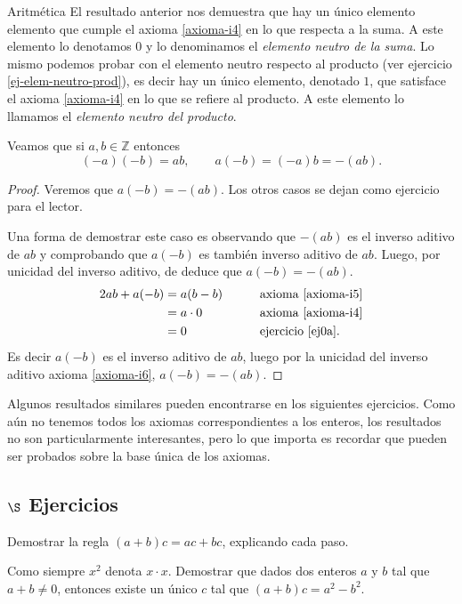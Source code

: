 \begin{section}{Aritmética}
El resultado anterior nos demuestra que hay un único elemento elemento que cumple el axioma \ref{axioma-i4} en lo que respecta a la suma. A este elemento lo denotamos $0$ y lo denominamos el \textit{elemento neutro de la suma}. Lo mismo podemos probar con el elemento neutro respecto al producto (ver ejercicio \ref{ej-elem-neutro-prod}),  es decir hay un único elemento,  denotado $1$, que satisface el axioma \ref{axioma-i4} en lo que se refiere al producto. A  este elemento lo llamamos el \textit{elemento neutro del producto}.  

\begin{proposicion} Veamos que  si $a,b \in \mathbb Z$ entonces
$$
(-a)(-b) = ab ,\qquad a(-b) = (-a)b = -(ab).
$$
\end{proposicion}
\begin{proof}
Veremos que  $a(-b) = -(ab)$. Los otros casos se dejan como ejercicio para el lector.

Una forma de demostrar este caso es  observando que $-(ab)$ es el inverso aditivo de $ab$ y comprobando que $a(-b)$ es también inverso aditivo de $ab$. Luego, por unicidad del inverso aditivo, de deduce que $a(-b) = -(ab)$. 
\begin{alignat*}2
ab + a(-b) &=a(b-b) &\qquad &\text{axioma \ref{axioma-i5}} \\
&=a\cdot 0 &\qquad &\text{axioma \ref{axioma-i4}}\\
&= 0 &\qquad &\text{ejercicio \ref{ej0a}}.
\end{alignat*}
Es decir $a(-b)$ es el inverso aditivo de $ab$, luego por la unicidad del inverso aditivo axioma \ref{axioma-i6}, $a(-b)=-(ab)$.
\end{proof}


Algunos resultados similares pueden encontrarse en los siguientes ejercicios. Como aún no tenemos todos los axiomas correspondientes a los enteros, los resultados no son particularmente interesantes, pero lo que importa es recordar que pueden ser probados sobre la base única de los axiomas.


\subsection*{$\S$ Ejercicios}

\begin{enumex}

\item Demostrar la regla $(a+b)c=ac+bc$, explicando cada paso.

\item Como siempre $x^2$ denota $x\cdot x$. Demostrar que dados dos enteros $a$ y $b$ tal que $a+b \not=0$, entonces existe un único $c$ tal que $(a+b)c=
a^2 - b^2$.


\end{enumex}
\end{section}
